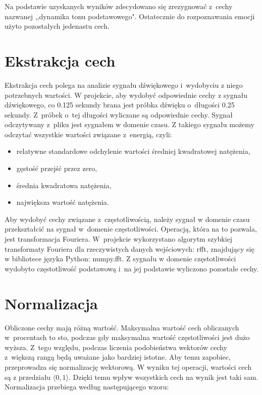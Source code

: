 \documentclass[declaration,shortabstract]{iithesis}
\begin{document}
Na podstawie uzyskanych wyników zdecydowano się zrezygnować z~cechy nazwanej ,,dynamika tonu podstawowego". Ostatecznie do rozpoznawania emocji użyto pozostałych jedenastu cech.

\section{Ekstrakcja cech}

Ekstrakcja cech polega na analizie sygnału dźwiękowego i~wydobyciu z niego potrzebnych wartości. W projekcie, aby wydobyć odpowiednie cechy z sygnału dźwiękowego, co 0.125 sekundy brana jest próbka dźwięku o~długości 0.25 sekundy. Z~próbek o~tej długości wyliczane są odpowiednie cechy. Sygnał odczytywany z~pliku jest sygnałem w domenie czasu. Z takiego sygnału możemy odczytać wszystkie wartości związane z~energią, czyli:
\begin{itemize}
\item relatywne standardowe odchylenie wartości średniej kwadratowej natężenia,
\item gęstość przejść przez zero,
\item średnia kwadratowa natężenia, 
\item największa wartość natężenia.
\end{itemize}

Aby wydobyć cechy związane z~częstotliwością, należy sygnał w domenie czasu przekształcić na sygnał w~domenie częstotliwości. Operacją, która na to pozwala, jest transformacja Fouriera. W~projekcie wykorzystano algorytm szybkiej transformaty Fouriera dla rzeczywistych danych wejściowych: rfft, znajdujący się w bibliotece języka Python: numpy.fft. Z sygnału w domenie częstotliwości wydobyto częstotliwość podstawową i~na jej podstawie wyliczono pozostałe cechy.

\section{Normalizacja}

Obliczone cechy mają różną wartość. Maksymalna wartość cech obliczanych w~procentach to sto, podczas gdy maksymalna wartość częstotliwości jest dużo wyższa. Z~tego względu, podczas liczenia podobieństwa wektorów cechy z~większą rangą będą uważane jako bardziej istotne. Aby temu zapobiec, przeprowadza się normalizację wektorową. W wyniku tej operacji, wartości cech są z przedziału $\langle0,1\rangle$. Dzięki temu wpływ wszystkich cech na wynik jest taki sam. Normalizacja przebiega według następującego wzoru:
\end{document}
